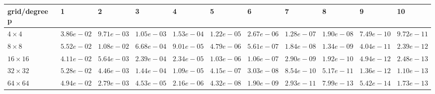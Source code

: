 \begin{tabular}{lllllllllll}
\hline
 grid/degree p   & 1          & 2          & 3          & 4          & 5          & 6          & 7          & 8          & 9          & 10         \\
\hline
 $4 \times 4$    & $3.86e-02$ & $9.71e-03$ & $1.05e-03$ & $1.53e-04$ & $1.22e-05$ & $2.67e-06$ & $1.28e-07$ & $1.90e-08$ & $7.49e-10$ & $9.72e-11$ \\
 $8 \times 8$    & $5.52e-02$ & $1.08e-02$ & $6.68e-04$ & $9.01e-05$ & $4.79e-06$ & $5.61e-07$ & $1.84e-08$ & $1.34e-09$ & $4.04e-11$ & $2.39e-12$ \\
 $16 \times 16$  & $4.11e-02$ & $5.64e-03$ & $2.39e-04$ & $2.34e-05$ & $1.03e-06$ & $1.06e-07$ & $2.90e-09$ & $1.92e-10$ & $4.94e-12$ & $2.48e-13$ \\
 $32 \times 32$  & $5.28e-02$ & $4.46e-03$ & $1.44e-04$ & $1.09e-05$ & $4.15e-07$ & $3.03e-08$ & $8.54e-10$ & $5.17e-11$ & $1.36e-12$ & $1.10e-13$ \\
 $64 \times 64$  & $4.94e-02$ & $2.79e-03$ & $4.53e-05$ & $2.16e-06$ & $4.32e-08$ & $1.90e-09$ & $2.93e-11$ & $7.99e-13$ & $5.42e-14$ & $1.73e-13$ \\
\hline
\end{tabular}